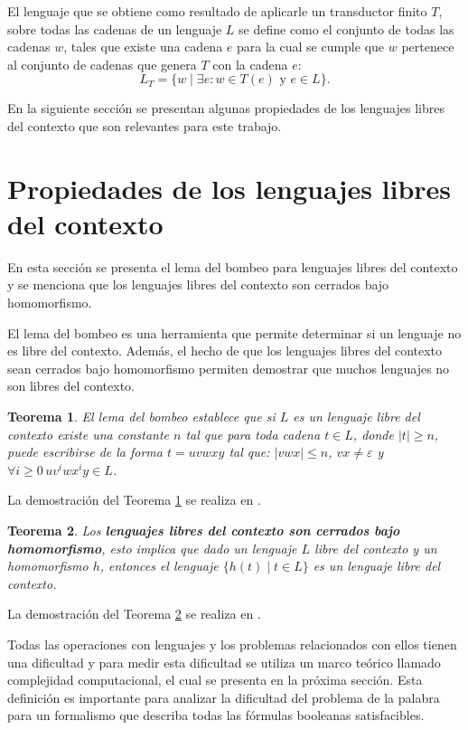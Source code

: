 \documentclass[12pt]{article}
\newtheorem{theorem}{Teorema}
\begin{document}
El lenguaje que se obtiene como resultado de aplicarle un transductor finito $T$, sobre todas las cadenas de un lenguaje $L$ se define como
el conjunto de todas las cadenas $w$, tales que existe una cadena $e$ para la cual se cumple que $w$ pertenece al conjunto de cadenas
que genera $T$ con la cadena $e$:
$$L_T=\{w\mid \exists e: w\in T(e) \text{ y }e\in L\}.$$

En la siguiente sección se presentan algunas propiedades de los lenguajes libres del contexto que son relevantes para este trabajo.

\section{Propiedades de los lenguajes libres del contexto}

En esta sección se presenta el lema del bombeo para lenguajes libres del contexto y se menciona que los lenguajes libres del contexto son cerrados bajo homomorfismo.

El lema del bombeo es una herramienta
que permite determinar si un lenguaje no es libre del contexto. Además,
el hecho de que los lenguajes libres del contexto sean cerrados bajo homomorfismo permiten
demostrar que muchos lenguajes no son libres del contexto.

\begin{theorem}
  \label{teo:lemBom}
  El lema del bombeo establece que si $L$ es un lenguaje libre del contexto
  existe una constante $n$ tal que para toda cadena $t\in L$, donde $|t|\geq n$, puede escribirse de la forma $t=uvwxy$ tal que:
  $|vwx|\leq n$, $vx\neq \varepsilon$ y $\forall i\geq 0\,uv^iwx^iy\in L$.  
\end{theorem}

La demostración del Teorema \ref{teo:lemBom} se realiza en \cite{authomataTheory}.

\begin{theorem}
  \label{teo:CFLh}
  Los \textbf{lenguajes libres del contexto son cerrados bajo homomorfismo}, esto
  implica que dado un lenguaje $L$ libre del contexto y un homomorfismo $h$, entonces el lenguaje
  $\{h(t)\mid t\in L\}$ es un lenguaje libre del contexto.  
\end{theorem}

La demostración del Teorema \ref{teo:CFLh} se realiza en \cite{authomataTheory}.

Todas las operaciones con lenguajes y los problemas relacionados con ellos tienen una dificultad y para medir esta dificultad
se utiliza un marco teórico llamado complejidad computacional, el cual se presenta en la próxima sección. Esta definición
es importante para analizar la dificultad del problema de la palabra para un formalismo que describa todas las fórmulas booleanas
satisfacibles.
\end{document}
